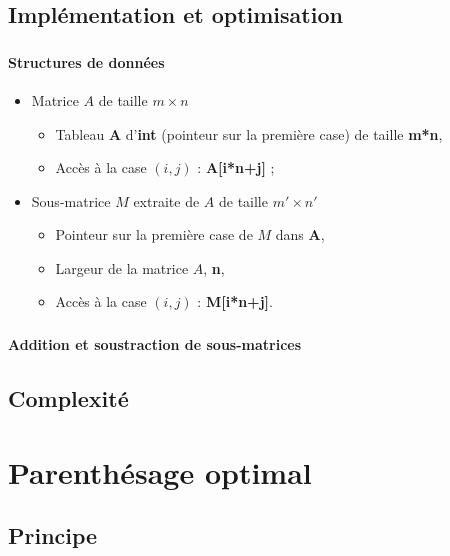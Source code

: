\documentclass{beamer}
\begin{document}
\subsection{Implémentation et optimisation}
\begin{frame}
  \frametitle{\insertsubsection}
  \framesubtitle{Structures de données}
  \begin{itemize}
    \item Matrice $A$ de taille $m\times n$
    \begin{itemize}
      \item Tableau {\bf A} d'{\bf int}
      (pointeur sur la première case) de taille {\bf m*n},
      \item Accès à la case $(i,j)$ : {\bf A[i*n+j]} ;
    \end{itemize}
    \item<2-> Sous-matrice $M$ extraite de $A$ de taille $m'\times n'$
    \begin{itemize}
      \item Pointeur sur la première case de $M$ dans {\bf A},
      \item Largeur de la matrice $A$, {\bf n},
      \item Accès à la case $(i,j)$ : {\bf M[i*n+j]}.
    \end{itemize}
  \end{itemize}
\end{frame}

\begin{frame}
  \frametitle{\insertsubsection}
  \framesubtitle{Addition et soustraction de sous-matrices}
\end{frame}

\subsection{Complexité}
\begin{frame}
  \frametitle{\insertsubsection}
\end{frame}



\section{Parenthésage optimal}
\subsection{Principe}
\begin{frame}
  \frametitle{\insertsubsection}
\end{frame}
\end{document}
